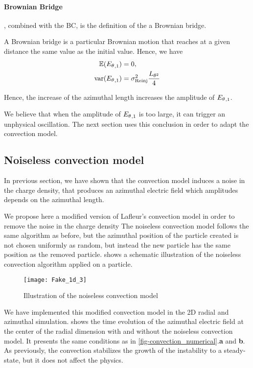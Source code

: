     \paragraph{Brownian Bridge\\}
      , combined with the \ac{BC}, is the definition of the a Brownian bridge.
      
      A Brownian bridge is a particular Brownian motion that reaches at a given distance the same value as the initial value.
      Hence, we have \citep{ibe2013}
      \begin{align*}
        \mathbb{E}({E_{\theta}}_{, 1}) &= 0,  \\
        {\rm var}({E_{\theta}}_{, 1}) &= \sigma_{\rm Reinj}^2 \frac{L_{\theta^2}}{4}
      \end{align*}
    
      Hence, the increase of the azimuthal length increases the amplitude of ${E_{\theta}}_{, 1}$.
      
    
    We believe that when the amplitude of ${E_{\theta}}_{, 1}$ is too large, it can trigger an unphysical oscillation.
    The next section uses this conclusion in order to adapt the convection model.
    
    \subsection{Noiseless convection model}
      \label{sec-noiselessresults}
      In previous section, we have shown that the convection model induces a noise in the charge density, that produces an azimuthal electric field which amplitudes depends on the azimuthal length.
      
      We propose here a modified version of Lafleur's convection model in order to remove the noise in the charge density
      The noiseless convection model follows the same algorithm as before, but the azimuthal position of the particle created is not chosen uniformly as random, but instead the new particle has the same position as the removed particle.
       shows a schematic illustration of the noiseless convection algorithm applied on a particle.
      
      \begin{figure}[hbt]
        \centering
        \texttt{[image: Fake\_1d\_3]}
        \caption{Illustration of the noiseless convection model}
        \label{fig-fakez3}
      \end{figure}
      
      We have implemented this modified convection model in the \ac{2D} radial and azimuthal simulation.
       shows the time  evolution of the azimuthal electric field at the center of the radial dimension with and without the noiseless convection model.
      It presents the same conditions as in \cref{fig-convection_numerical}.{\bf a} and {\bf b}. 
      As previously, the convection stabilizes the growth of the instability to a steady-state, but it does not affect the physics.
       
